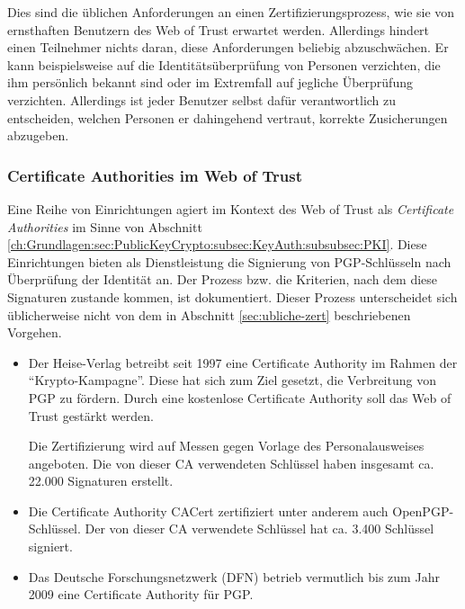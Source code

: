 Dies sind die üblichen Anforderungen an einen
Zertifizierungsprozess, wie sie von ernsthaften Benutzern des Web of
Trust erwartet werden. Allerdings hindert einen Teilnehmer nichts
daran, diese Anforderungen beliebig abzuschwächen. Er kann
beispielsweise auf die Identitätsüberprüfung von Personen
verzichten, die ihm persönlich bekannt sind oder im Extremfall auf
jegliche Überprüfung verzichten. Allerdings ist jeder Benutzer
selbst dafür verantwortlich zu entscheiden, welchen Personen er
dahingehend vertraut, korrekte Zusicherungen abzugeben.

\subsubsection{Certificate Authorities im Web of Trust}
\label{sec:cert-auth-im}

Eine Reihe von Einrichtungen agiert im Kontext des Web of Trust als
\emph{Certificate Authorities} im Sinne von Abschnitt
\ref{ch:Grundlagen:sec:PublicKeyCrypto:subsec:KeyAuth:subsubsec:PKI}. Diese
Einrichtungen bieten als Dienstleistung die Signierung von
PGP-Schlüsseln nach Überprüfung der Identität an. Der Prozess
bzw. die Kriterien, nach dem diese Signaturen zustande kommen, ist
dokumentiert. Dieser Prozess unterscheidet sich üblicherweise nicht
von dem in Abschnitt \ref{sec:ubliche-zert} beschriebenen Vorgehen.

\begin{itemize}
\item Der Heise-Verlag betreibt seit 1997 eine Certificate Authority
  im Rahmen der ``Krypto-Kampagne''. Diese hat sich zum Ziel gesetzt,
  die Verbreitung von PGP zu fördern. Durch eine kostenlose
  Certificate Authority soll das Web of Trust gestärkt werden.

  Die Zertifizierung wird auf Messen gegen Vorlage des
  Personalausweises angeboten. Die von dieser CA verwendeten
  Schlüssel haben insgesamt ca. 22.000 Signaturen erstellt.
\item Die Certificate Authority CACert zertifiziert unter
  anderem auch OpenPGP-Schlüssel. Der von dieser CA verwendete
  Schlüssel hat ca. 3.400 Schlüssel signiert.
\item Das Deutsche Forschungsnetzwerk (DFN) betrieb vermutlich bis zum
  Jahr 2009 eine Certificate Authority für PGP.
\end{itemize}

